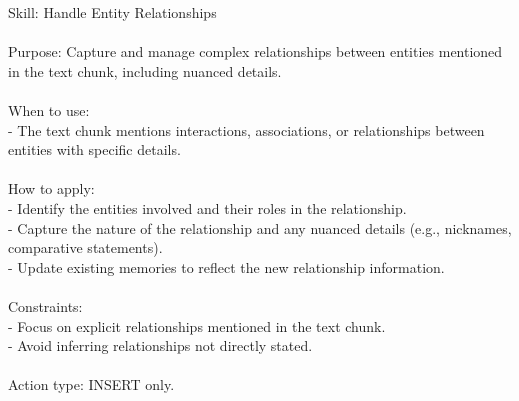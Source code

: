 \begin{center}
\begin{tcolorbox}[
  title={Evolved Skill on LoCoMo - HANDLE\_ENTITY\_RELATIONSHIPS},
  colback=blue!2!white,
  colframe=blue!35!black,
  colbacktitle=blue!15!white,
  coltitle=black,
  coltext=black
]
{
Skill: Handle Entity Relationships \\\\
Purpose: Capture and manage complex relationships between entities mentioned in the text chunk, including nuanced details. \\\\
When to use: \\
- The text chunk mentions interactions, associations, or relationships between entities with specific details. \\\\
How to apply: \\
- Identify the entities involved and their roles in the relationship. \\
- Capture the nature of the relationship and any nuanced details (e.g., nicknames, comparative statements). \\
- Update existing memories to reflect the new relationship information. \\\\
Constraints: \\
- Focus on explicit relationships mentioned in the text chunk. \\
- Avoid inferring relationships not directly stated. \\\\
Action type: INSERT only.
}
\label{appendix:case_handle_entity_relationships}
\end{tcolorbox}
\end{center}

